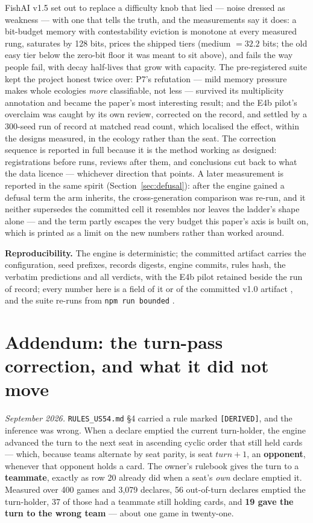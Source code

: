 \documentclass[11pt]{article}
\newcommand{\code}[1]{\texttt{#1}}
\begin{document}
FishAI v1.5 set out to replace a difficulty knob that lied --- noise dressed as
weakness --- with one that tells the truth, and the measurements say it does: a
bit-budget memory with contestability eviction is monotone at every measured rung,
saturates by 128 bits, prices the shipped tiers (medium $= 32.2$ bits; the old easy
tier below the zero-bit floor it was meant to sit above), and fails the way people
fail, with decay half-lives that grow with capacity. The pre-registered suite kept the
project honest twice over: P7's refutation --- mild memory pressure makes whole
ecologies \emph{more} classifiable, not less --- survived its multiplicity annotation
and became
the paper's most interesting result; and the E4b pilot's overclaim was caught by its
own review, corrected on the record, and settled by a 300-seed run of record at
matched read count, which localised the effect, within the designs measured, in the
ecology rather than the seat.
The correction sequence is reported in full because it is the method working as
designed: registrations before runs, reviews after them, and conclusions cut back to
what the data licence --- whichever direction that points.
A later measurement is reported in the same spirit (Section~\ref{sec:defusal}): after the engine
gained a defusal term the arm inherits, the cross-generation comparison was re-run, and it
neither supersedes the committed cell it resembles nor leaves the ladder's shape alone --- and
the term partly escapes the very budget this paper's axis is built on, which is printed as a
limit on the new numbers rather than worked around.

\medskip
\noindent\textbf{Reproducibility.} The engine is deterministic; the committed artifact
\cite{artifact} carries the configuration, seed prefixes, records digests, engine
commits, rules hash, the verbatim predictions and all verdicts, with the E4b pilot
retained beside the run of record; every number here is a field of it or of the
committed v1.0 artifact \cite{adaptiveartifact}, and the suite re-runs from
\code{npm run bounded} \cite{repo}.

\section{Addendum: the turn-pass correction, and what it did not move}
\label{sec:addturnpass}

\emph{September 2026.} \code{RULES\_US54.md} \S4 carried a rule marked \code{[DERIVED]}, and the
inference was wrong. When a declare emptied the current turn-holder, the engine advanced the turn
to the next seat in ascending cyclic order that still held cards --- which, because teams alternate
by seat parity, is seat $\mathit{turn}+1$, an \textbf{opponent}, whenever that opponent holds a
card. The owner's rulebook gives the turn to a \textbf{teammate}, exactly as row 20 already did
when a seat's \emph{own} declare emptied it. Measured over 400 games and 3{,}079 declares, 56
out-of-turn declares emptied the turn-holder, 37 of those had a teammate still holding cards, and
\textbf{19 gave the turn to the wrong team} --- about one game in twenty-one.
\end{document}
